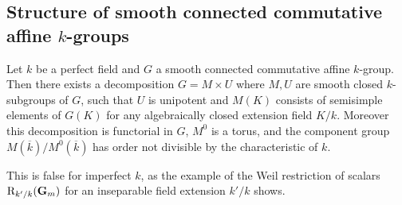 \documentclass[10pt]{article}
\renewcommand{\(}{\left(}
\renewcommand{\)}{\right)}
\renewcommand{\bar}{\overline}
\numberwithin{thm}{subsection}
\begin{document}
\subsection{Structure of smooth connected commutative affine $k$-groups}
\begin{thm}\label{structurecommutative}
Let $k$ be a perfect field
and $G$ a smooth connected commutative affine $k$-group.
Then
there exists a decomposition $G=M\times U$
where $M,U$ are smooth closed $k$-subgroups of $G$,
such that $U$ is unipotent
and $M(K)$ consists of semisimple elements
of $G(K)$ for any algebraically closed extension field $K/k$.
Moreover this decomposition is functorial in $G$,
$M^0$ is a torus, and the component group
$M(\bar k)/M^0(\bar k)$ has order not divisible by the characteristic of $k$.
\end{thm}
\begin{rem}
This is false for imperfect $k$,
as the example of the Weil restriction of scalars
${\rm{R}}_{k'/k}(\mathbf{G}_m)$ for an inseparable field extension $k'/k$
shows.
\end{rem}
\end{document}
